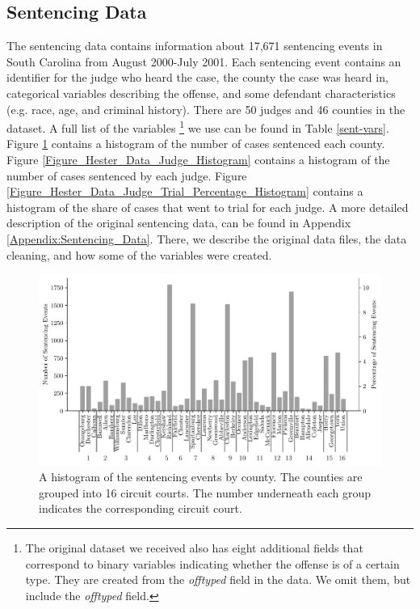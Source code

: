 \documentclass[11pt, oneside]{article}   	%
\theoremstyle{ModifiedStyle}
\begin{document}
  \subsection{Sentencing Data}
    The sentencing data contains information about 17,671 sentencing events in South Carolina from August 2000-July 2001. Each sentencing event contains an identifier for the judge who heard the case, the county the case was heard in, categorical variables describing the offense, and some defendant characteristics (e.g. race, age, and criminal history). There are 50 judges and 46 counties in the dataset. A full list of the variables \footnote{The original dataset we received also has eight additional fields that correspond to binary variables indicating whether the offense is of a certain type. They are created from the \textit{offtyped} field in the data. We omit them, but include the \textit{offtyped} field.} we use can be found in Table \ref{sent-vars}.  Figure \ref{Figure_Hester_Data_County_Histogram} contains a histogram of the number of cases sentenced each county. Figure \ref{Figure_Hester_Data_Judge_Histogram} contains a histogram of the number of cases sentenced by each judge. Figure \ref{Figure_Hester_Data_Judge_Trial_Percentage_Histogram} contains a histogram of the share of cases that went to trial for each judge. A more detailed description of the original sentencing data, can be found in Appendix \ref{Appendix:Sentencing_Data}. There, we describe the original data files, the data cleaning, and how some of the variables were created.

		\begin{figure}[H]
			\centering
			\includegraphics[scale=0.75]{Figures/County_Histogram}
			\vspace{-2mm}
			\caption{A histogram of the sentencing events by county. The counties are grouped into 16 circuit courts. The number underneath each group indicates the corresponding circuit court.}
			\label{Figure_Hester_Data_County_Histogram}
		\end{figure}
\end{document}
